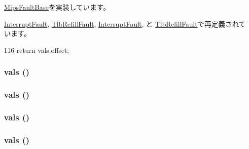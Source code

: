 \hyperlink{classMipsISA_1_1MipsFaultBase_abc58e13990620c35409a5eaf15679c3c}{MipsFaultBase}を実装しています。

\hyperlink{classMipsISA_1_1InterruptFault_a9c059b781f653170e9da1d520c6d96b1}{InterruptFault}, \hyperlink{classMipsISA_1_1TlbRefillFault_a9c059b781f653170e9da1d520c6d96b1}{TlbRefillFault}, \hyperlink{classMipsISA_1_1InterruptFault_a9c059b781f653170e9da1d520c6d96b1}{InterruptFault}, と \hyperlink{classMipsISA_1_1TlbRefillFault_a9c059b781f653170e9da1d520c6d96b1}{TlbRefillFault}で再定義されています。


\begin{DoxyCode}
116 { return vals.offset; }
\end{DoxyCode}
\hypertarget{classMipsISA_1_1MipsFault_a50008688f18bfb8180039ca4b99b552f}{
\subsubsection[{vals}]{ {\bf vals} ()}}
\label{classMipsISA_1_1MipsFault_a50008688f18bfb8180039ca4b99b552f}
\hypertarget{classMipsISA_1_1MipsFault_a8b3c2006cfd550d551232a82b397bbca}{
\subsubsection[{vals}]{ {\bf vals} ()}}
\label{classMipsISA_1_1MipsFault_a8b3c2006cfd550d551232a82b397bbca}
\hypertarget{classMipsISA_1_1MipsFault_a8b3c2006cfd550d551232a82b397bbca}{
\subsubsection[{vals}]{ {\bf vals} ()}}
\label{classMipsISA_1_1MipsFault_a8b3c2006cfd550d551232a82b397bbca}
\hypertarget{classMipsISA_1_1MipsFault_a8b3c2006cfd550d551232a82b397bbca}{
\subsubsection[{vals}]{ {\bf vals} ()}}

